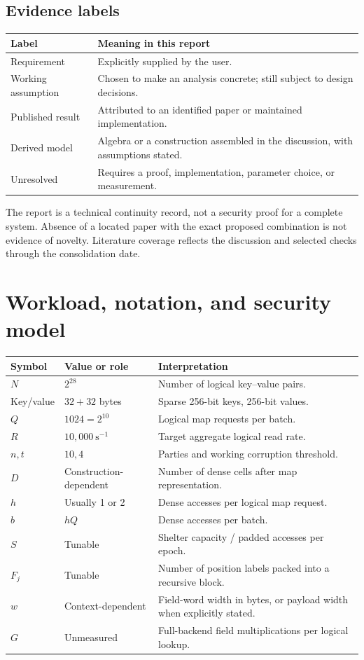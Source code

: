 \documentclass[11pt]{article}
\begin{document}
\subsection{Evidence labels}

\begin{tabularx}{\textwidth}{@{}lY@{}}
\toprule
Label & Meaning in this report \\
\midrule
Requirement & Explicitly supplied by the user. \\
Working assumption & Chosen to make an analysis concrete; still subject to design decisions. \\
Published result & Attributed to an identified paper or maintained implementation. \\
Derived model & Algebra or a construction assembled in the discussion, with assumptions stated. \\
Unresolved & Requires a proof, implementation, parameter choice, or measurement. \\
\bottomrule
\end{tabularx}

The report is a technical continuity record, not a security proof for a complete
system. Absence of a located paper with the exact proposed combination is not
evidence of novelty. Literature coverage reflects the discussion and selected
checks through the consolidation date.

\section{Workload, notation, and security model}\label{sec:workload}

\begin{tabularx}{\textwidth}{@{}l l Y@{}}
\toprule
Symbol & Value or role & Interpretation \\
\midrule
$N$ & $2^{28}$ & Number of logical key--value pairs. \\
Key/value & $32+32$ bytes & Sparse 256-bit keys, 256-bit values. \\
$Q$ & $1024=2^{10}$ & Logical map requests per batch. \\
$R$ & $10{,}000\ \mathrm{s}^{-1}$ & Target aggregate logical read rate. \\
$n,t$ & $10,4$ & Parties and working corruption threshold. \\
$D$ & Construction-dependent & Number of dense cells after map representation. \\
$h$ & Usually 1 or 2 & Dense accesses per logical map request. \\
$b$ & $hQ$ & Dense accesses per batch. \\
$S$ & Tunable & Shelter capacity / padded accesses per epoch. \\
$F_j$ & Tunable & Number of position labels packed into a recursive block. \\
$w$ & Context-dependent & Field-word width in bytes, or payload width when explicitly stated. \\
$G$ & Unmeasured & Full-backend field multiplications per logical lookup. \\
\bottomrule
\end{tabularx}
\end{document}
